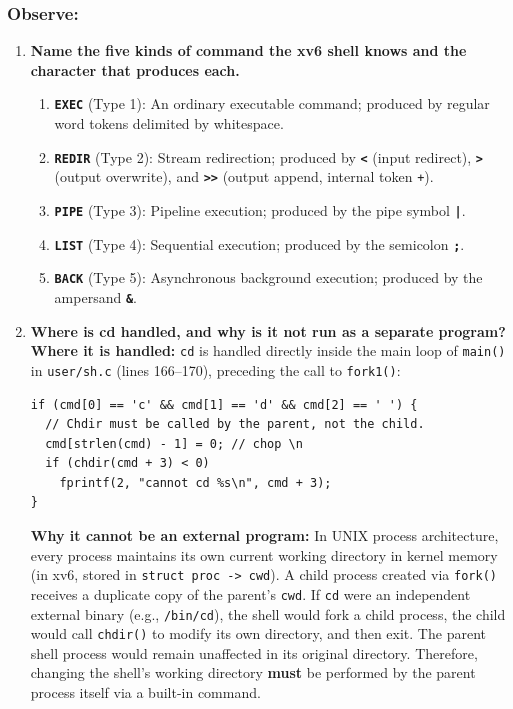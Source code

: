 \documentclass{labreport}
\begin{document}
\subsubsection*{Observe:}
\begin{enumerate}[leftmargin=*]
    \item \textbf{Name the five kinds of command the xv6 shell knows and the character that produces each.}
    \begin{enumerate}[label=\arabic*., noitemsep, topsep=2pt]
        \item \textbf{\texttt{EXEC}} (Type 1): An ordinary executable command; produced by regular word tokens delimited by whitespace.
        \item \textbf{\texttt{REDIR}} (Type 2): Stream redirection; produced by \textbf{\texttt{<}} (input redirect), \textbf{\texttt{>}} (output overwrite), and \textbf{\texttt{>>}} (output append, internal token \texttt{+}).
        \item \textbf{\texttt{PIPE}} (Type 3): Pipeline execution; produced by the pipe symbol \textbf{\texttt{|}}.
        \item \textbf{\texttt{LIST}} (Type 4): Sequential execution; produced by the semicolon \textbf{\texttt{;}}.
        \item \textbf{\texttt{BACK}} (Type 5): Asynchronous background execution; produced by the ampersand \textbf{\texttt{\&}}.
    \end{enumerate}

    \item \textbf{Where is cd handled, and why is it not run as a separate program?}\\[0.2em]
    \textbf{Where it is handled:} \texttt{cd} is handled directly inside the main loop of \texttt{main()} in \texttt{user/sh.c} (lines 166--170), preceding the call to \texttt{fork1()}:
\begin{lstlisting}[style=c]
if (cmd[0] == 'c' && cmd[1] == 'd' && cmd[2] == ' ') {
  // Chdir must be called by the parent, not the child.
  cmd[strlen(cmd) - 1] = 0; // chop \n
  if (chdir(cmd + 3) < 0)
    fprintf(2, "cannot cd %s\n", cmd + 3);
}
\end{lstlisting}
    \textbf{Why it cannot be an external program:} In UNIX process architecture, every process maintains its own current working directory in kernel memory (in xv6, stored in \texttt{struct proc -> cwd}). A child process created via \texttt{fork()} receives a duplicate copy of the parent's \texttt{cwd}. If \texttt{cd} were an independent external binary (e.g., \texttt{/bin/cd}), the shell would fork a child process, the child would call \texttt{chdir()} to modify its own directory, and then exit. The parent shell process would remain unaffected in its original directory. Therefore, changing the shell's working directory \textbf{must} be performed by the parent process itself via a built-in command.


\end{enumerate}
\end{document}
